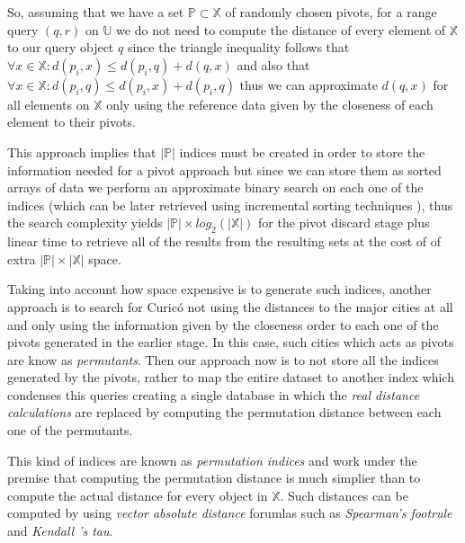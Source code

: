 So, assuming that we have a set $\mathbb{P} \subset \mathbb{X}$ of randomly chosen pivots, for a range query $(q,r)$ on $\mathbb{U}$ we do not need to 
compute the distance of every element of $\mathbb{X}$ to our query object $q$ since the triangle inequality follows that 
$\forall x \in \mathbb{X} : d(p_i,x) \leq d(p_i, q) + d(q,x)$ and also that $\forall x \in \mathbb{X} : d(p_i,q) \leq d(p_i, x) + d(p_i,q)$ thus
we can approximate $d(q,x)$ for all elements on $\mathbb{X}$ only using the reference data given by the closeness of each element to their pivots.

This approach implies that $|\mathbb{P}|$ indices must be created in order to store the information needed for a pivot approach but since we can store them
as sorted arrays of data we perform an approximate binary search on each one of the indices (which can be later retrieved using incremental sorting 
techniques \cite{7416566}), thus the search complexity yields $|\mathbb{P}| \times log_2(|\mathbb{X}|)$ for the pivot discard stage plus linear time to retrieve 
all of the results from the resulting sets at the cost of  of extra $|\mathbb{P}|\times|\mathbb{X}|$ space. 

Taking into account how space expensive is to generate such indices, another approach is to search for Curicó not using the distances to the major cities
at all and only using the information given by the closeness order to each one of the pivots generated in the earlier stage. In this case, such cities which
acts as pivots are know as \emph{permutants}. Then our approach now is to not store all the indices generated by the pivots, rather to map the entire dataset to another index which condenses this queries
creating a single database in which the \emph{real distance calculations} are replaced by computing the permutation distance between each one of the permutants.

This kind of indices are known as \emph{permutation indices} and work under the premise that computing the permutation distance is much simplier than
to compute the actual distance for every object in $\mathbb{X}$. Such distances can be computed by using \emph{vector absolute distance} forumlas such as
\emph{Spearman's footrule} and \emph{Kendall 's tau}.

